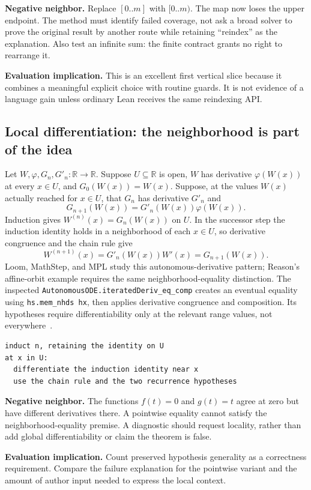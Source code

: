 \documentclass[11pt,letterpaper]{article}
\newcommand{\code}[1]{\nolinkurl{#1}}
\newcommand{\R}{\mathbb R}
\begin{document}
\textbf{Negative neighbor.} Replace \([0..m]\) with \([0..m)\). The map now loses
the upper endpoint. The method must identify failed coverage, not ask a broad
solver to prove the original result by another route while retaining ``reindex''
as the explanation. Also test an infinite sum: the finite contract grants no
right to rearrange it.

\textbf{Evaluation implication.} This is an excellent first vertical slice because
it combines a meaningful explicit choice with routine guards. It is not evidence
of a language gain unless ordinary Lean receives the same reindexing API.

\subsection{Local differentiation: the neighborhood is part of the idea}
Let \(W,\varphi,G_n,G'_n:\R\to\R\). Suppose \(U\subseteq\R\) is open,
\(W\) has derivative \(\varphi(W(x))\) at every \(x\in U\), and
\(G_0(W(x))=W(x)\). Suppose, at the values \(W(x)\) actually reached for
\(x\in U\), that \(G_n\) has derivative \(G'_n\) and
\[
 G_{n+1}(W(x))=G'_n(W(x))\varphi(W(x)).
\]
Induction gives \(W^{(n)}(x)=G_n(W(x))\) on \(U\). In the successor step the
induction identity holds in a neighborhood of each \(x\in U\), so derivative
congruence and the chain rule give
\[
 W^{(n+1)}(x)=G'_n(W(x))W'(x)=G_{n+1}(W(x)).
\]
Loom, MathStep, and MPL study this autonomous-derivative pattern; Reason's affine-orbit
example requires the same neighborhood-equality distinction. The inspected
\code{AutonomousODE.iteratedDeriv_eq_comp} creates an eventual equality using
\texttt{hs.mem\_nhds hx}, then applies derivative congruence and composition.
Its hypotheses require differentiability only at the relevant range values,
not everywhere~\cite{p-ode}.

\begin{lstlisting}
induct n, retaining the identity on U
at x in U:
  differentiate the induction identity near x
  use the chain rule and the two recurrence hypotheses
\end{lstlisting}

\textbf{Negative neighbor.} The functions \(f(t)=0\) and \(g(t)=t\) agree at
zero but have different derivatives there. A pointwise equality cannot satisfy
the neighborhood-equality premise. A diagnostic should request locality, rather
than add global differentiability or claim the theorem is false.

\textbf{Evaluation implication.} Count preserved hypothesis generality as a
correctness requirement. Compare the failure explanation for the pointwise
variant and the amount of author input needed to express the local context.
\end{document}
